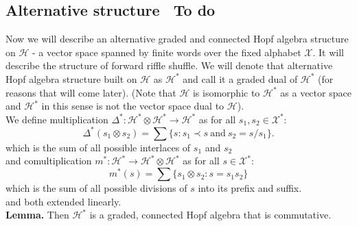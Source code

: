 \documentclass[a4paper, 12pt]{report}
\newcommand{\smalltodo}[1]{\textbf{\ To do}}
\begin{document}
\subsection{Alternative structure \smalltodo{a}}
\indent Now we will describe an alternative graded and connected Hopf algebra structure on $\mathcal{H}$ - a
vector space spanned
by finite words over the fixed alphabet $\mathcal{X}$. It will describe the structure of forward riffle
shuffle.
We will denote that alternative Hopf algebra structure
built on $\mathcal{H}$ as $\mathcal{H}^*$ and call it a graded dual of $\mathcal{H}^*$ (for reasons that
will come later).
(Note that $\mathcal{H}$ is isomorphic to $\mathcal{H}^*$ as a vector space and $\mathcal{H}^*$ in this
sense is not the vector space dual to $\mathcal{H}$). \\
We define multiplication $\Delta^* : \mathcal{H}^* \otimes \mathcal{H}^* \to \mathcal{H}^*$ as
for all $s_1, s_2 \in \mathcal{X}^*$:
\begin{equation*}
\Delta^*(s_1 \otimes s_2) = \sum\{s : s_1 \prec s \mathrm{\ and\ } s_2 = s/s_1\}.
\end{equation*}
which is the sum of all possible interlaces of $s_1$ and $s_2$ \\
and comultiplication $m^* : \mathcal{H}^* \to \mathcal{H}^* \otimes \mathcal{H}^*$ as for all $s \in
\mathcal{X}^*$:
\begin{equation*}
m^*(s) = \sum\{ s_1 \otimes s_2 : s=s_1s_2 \}
\end{equation*}
which is the sum of all possible divisions of $s$ into its prefix and suffix. \\
and both extended linearly. \\
\textbf{Lemma. } Then $\mathcal{H}^*$ is a graded, connected Hopf algebra that is commutative.
\end{document}
